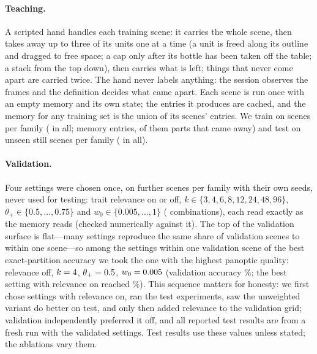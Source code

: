 \documentclass[10pt]{article}
\begin{document}
\paragraph{Teaching.} A scripted hand handles each training scene: it carries the whole scene, then takes away up to three of its units one at a time (a unit is freed along its outline and dragged to free space; a cap only after its bottle has been taken off the table; a stack from the top down), then carries what is left; things that never come apart are carried twice. The hand never labels anything: the session observes the frames and the definition decides what came apart. Each scene is run once with an empty memory and its own state; the entries it produces are cached, and the memory for any training set is the union of its scenes' entries. We train on \nTrainPerFamily{} scenes per family (\nTrainScenes{} in all; \nEntries{} memory entries, \nPositives{} of them parts that came away) and test on \nTestPerFamily{} unseen still scenes per family (\nTestScenes{} in all).

\paragraph{Validation.} Four settings were chosen once, on \nValPerFamily{} further scenes per family with their own seeds, never used for testing: trait relevance on or off, $k\in\{3,4,6,8,12,24,48,96\}$, $\theta_+\in\{0.5,\dots,0.75\}$ and $w_0\in\{0.005,\dots,1\}$ (\nValConfigs{} combinations), each read exactly as the memory reads (checked numerically against it). The top of the validation surface is flat---many settings reproduce the same share of validation scenes to within one scene---so among the settings within one validation scene of the best exact-partition accuracy we took the one with the highest panoptic quality: relevance off, $k=4$, $\theta_+=0.5$, $w_0=0.005$ (validation accuracy \valAcc\%; the best setting with relevance on reached \valAccRel\%). This sequence matters for honesty: we first chose settings with relevance on, ran the test experiments, saw the unweighted variant do better on test, and only then added relevance to the validation grid; validation independently preferred it off, and all reported test results are from a fresh run with the validated settings. Test results use these values unless stated; the ablations vary them.
\end{document}
